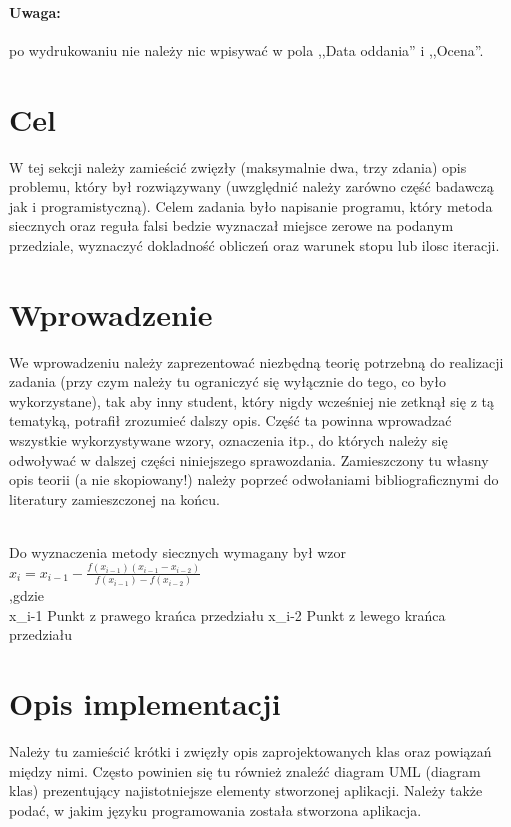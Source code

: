 \documentclass{classrep}
\begin{document}
{\color{blue}
\paragraph{Uwaga:} po wydrukowaniu nie należy nic wpisywać w pola ,,Data
oddania'' i ,,Ocena''.}

\section{Cel}
{\color{blue}
W tej sekcji należy zamieścić zwięzły (maksymalnie dwa, trzy zdania) opis
problemu, który był rozwiązywany (uwzględnić należy zarówno część badawczą jak
i programistyczną).
\color{black}
Celem zadania było napisanie programu, który metoda siecznych oraz reguła falsi bedzie wyznaczał miejsce zerowe na podanym przedziale, wyznaczyć dokladność obliczeń oraz warunek stopu lub ilosc iteracji. }

\section{Wprowadzenie}
{\color{blue}
We wprowadzeniu należy zaprezentować niezbędną teorię potrzebną do realizacji
zadania (przy czym należy tu ograniczyć się wyłącznie do tego, co było
wykorzystane), tak aby inny student, który nigdy wcześniej nie zetknął się z tą
tematyką, potrafił zrozumieć dalszy opis. Część ta powinna wprowadzać wszystkie
wykorzystywane wzory, oznaczenia itp., do których należy się odwoływać w
dalszej części niniejszego sprawozdania. Zamieszczony tu własny opis teorii
(a nie skopiowany!) należy poprzeć odwołaniami bibliograficznymi do literatury
zamieszczonej na końcu.

\color{black}
\\Do wyznaczenia metody siecznych wymagany był wzor 
\\
\begin{math}
x_{i}=x_{i-1} -\frac{ f(x_{i-1})(x_{i-1}-x_{i-2})  }{ f(x_{i-1})- f(x_{i-2})}
\end{math}
\\
,gdzie\\
 x_{i-1} Punkt z prawego krańca przedziału
 x_{i-2} Punkt z lewego krańca przedziału
\\


}

\section{Opis implementacji}
{\color{blue}
Należy tu zamieścić krótki i zwięzły opis zaprojektowanych klas oraz powiązań
między nimi. Często powinien się tu również znaleźć diagram UML (diagram klas)
prezentujący najistotniejsze elementy stworzonej aplikacji. Należy także podać,
w jakim języku programowania została stworzona aplikacja.}
\end{document}
